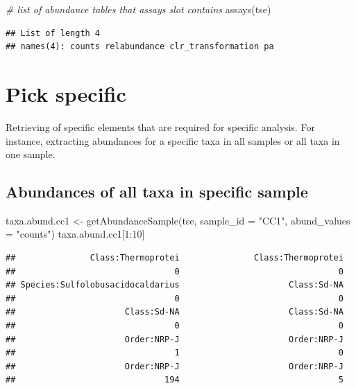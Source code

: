 \documentclass[
]{book}
\newenvironment{Shaded}{\begin{snugshade}}{\end{snugshade}}
\newcommand{\AttributeTok}[1]{\textcolor[rgb]{0.77,0.63,0.00}{#1}}
\newcommand{\CommentTok}[1]{\textcolor[rgb]{0.56,0.35,0.01}{\textit{#1}}}
\newcommand{\DecValTok}[1]{\textcolor[rgb]{0.00,0.00,0.81}{#1}}
\newcommand{\FunctionTok}[1]{\textcolor[rgb]{0.00,0.00,0.00}{#1}}
\newcommand{\NormalTok}[1]{#1}
\newcommand{\OtherTok}[1]{\textcolor[rgb]{0.56,0.35,0.01}{#1}}
\newcommand{\SpecialCharTok}[1]{\textcolor[rgb]{0.00,0.00,0.00}{#1}}
\newcommand{\StringTok}[1]{\textcolor[rgb]{0.31,0.60,0.02}{#1}}
\begin{document}
\begin{Shaded}
\begin{Highlighting}[]
\CommentTok{\# list of abundance tables that assays slot contains}
\FunctionTok{assays}\NormalTok{(tse)}
\end{Highlighting}
\end{Shaded}

\begin{verbatim}
## List of length 4
## names(4): counts relabundance clr_transformation pa
\end{verbatim}

\hypertarget{pick-specific}{%
\section{Pick specific}\label{pick-specific}}

Retrieving of specific elements that are required for specific analysis. For
instance, extracting abundances for a specific taxa in all samples or all taxa
in one sample.

\hypertarget{abundances-of-all-taxa-in-specific-sample}{%
\subsection{Abundances of all taxa in specific sample}\label{abundances-of-all-taxa-in-specific-sample}}

\begin{Shaded}
\begin{Highlighting}[]
\NormalTok{taxa.abund.cc1 }\OtherTok{\textless{}{-}} \FunctionTok{getAbundanceSample}\NormalTok{(tse, }
                                     \AttributeTok{sample\_id =} \StringTok{"CC1"}\NormalTok{,}
                                     \AttributeTok{abund\_values =} \StringTok{"counts"}\NormalTok{)}
\NormalTok{taxa.abund.cc1[}\DecValTok{1}\SpecialCharTok{:}\DecValTok{10}\NormalTok{]}
\end{Highlighting}
\end{Shaded}

\begin{verbatim}
##               Class:Thermoprotei               Class:Thermoprotei 
##                                0                                0 
## Species:Sulfolobusacidocaldarius                      Class:Sd-NA 
##                                0                                0 
##                      Class:Sd-NA                      Class:Sd-NA 
##                                0                                0 
##                      Order:NRP-J                      Order:NRP-J 
##                                1                                0 
##                      Order:NRP-J                      Order:NRP-J 
##                              194                                5
\end{verbatim}
\end{document}
